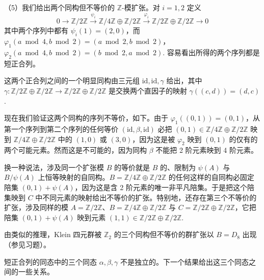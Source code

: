 \begin{example}
（5）我们给出两个同构但不等价的 \(\mathbb{Z}\)-模扩张。对 \(i = 1, 2\) 定义
\[
0 \longrightarrow \mathbb{Z}/2\mathbb{Z} \xrightarrow{\psi_i} \mathbb{Z}/4\mathbb{Z} \oplus \mathbb{Z}/2\mathbb{Z} \xrightarrow{\varphi_i} \mathbb{Z}/2\mathbb{Z} \oplus \mathbb{Z}/2\mathbb{Z} \longrightarrow 0
\]
其中两个序列中都有 \(\psi_i(1) = (2, 0)\)，而 \(\varphi_1(a \bmod 4, b \bmod 2) = (a \bmod 2, b \bmod 2)\)，\(\varphi_2(a \bmod 4, b \bmod 2) = (b \bmod 2, a \bmod 2)\). 容易看出所得的两个序列都是短正合列。

这两个正合列之间的一个明显同构由三元组 \(\mathrm{id}, \mathrm{id}, \gamma\) 给出，其中 \(\gamma : \mathbb{Z}/2\mathbb{Z} \oplus \mathbb{Z}/2\mathbb{Z} \to \mathbb{Z}/2\mathbb{Z} \oplus \mathbb{Z}/2\mathbb{Z}\) 是交换两个直因子的映射 \(\gamma((c, d)) = (d, c)\).

现在我们验证这两个同构的序列不等价，如下。由于 \(\varphi_1((0, 1)) = (0, 1)\)，从第一个序列到第二个序列的任何等价 \((\mathrm{id}, \beta, \mathrm{id})\) 必把 \((0, 1) \in \mathbb{Z}/4\mathbb{Z} \oplus \mathbb{Z}/2\mathbb{Z}\) 映到 \(\mathbb{Z}/4\mathbb{Z} \oplus \mathbb{Z}/2\mathbb{Z}\) 中的 \((1, 0)\) 或 \((3, 0)\)，因为这是被 \(\varphi_2\) 映到 \((0, 1)\) 的仅有的两个可能元素。然而这是不可能的，因为同构 \(\beta\) 不能把 2 阶元素映到 4 阶元素。

换一种说法，涉及同一个扩张模 \(B\) 的等价就是 \(B\) 的、限制为 \(\psi(A)\) 与 \(B/\psi(A)\) 上恒等映射的自同构。\(B = \mathbb{Z}/4\mathbb{Z} \oplus \mathbb{Z}/2\mathbb{Z}\) 的任何这样的自同构必固定陪集 \((0, 1)+\psi(A)\)，因为这是含 2 阶元素的唯一非平凡陪集。于是把这个陪集映到 \(C\) 中不同元素的映射给出不等价的扩张。特别地，还存在第三个不等价的扩张，涉及同样的模 \(A = \mathbb{Z}/2\mathbb{Z}\)、\(B = \mathbb{Z}/4\mathbb{Z} \oplus \mathbb{Z}/2\mathbb{Z}\) 与 \(C = \mathbb{Z}/2\mathbb{Z} \oplus \mathbb{Z}/2\mathbb{Z}\)，它把陪集 \((0, 1)+\psi(A)\) 映到元素 \((1, 1) \in \mathbb{Z}/2\mathbb{Z} \oplus \mathbb{Z}/2\mathbb{Z}\).

由类似的推理，Klein 四元群被 \(\mathbb{Z}_2\) 的三个同构但不等价的群扩张以 \(B = D_8\) 出现（参见习题）。
\end{example}

短正合列的同态中的三个同态 \(\alpha, \beta, \gamma\) 不是独立的。下一个结果给出这三个同态之间的一些关系。

